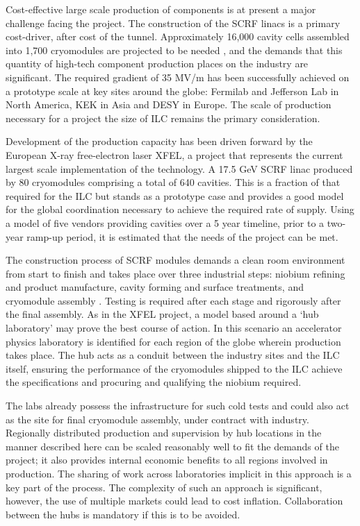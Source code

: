 Cost-effective large scale production of components is at present a major challenge facing the project. The construction of the SCRF linacs is a primary cost-driver, after cost of the tunnel. Approximately 16,000 cavity cells assembled into 1,700 cryomodules are projected to be needed \cite{ILC:PIPReport}, and the demands that this quantity of high-tech component production places on the industry are significant. The required gradient of 35 MV/m has been successfully achieved on a prototype scale at key sites around the globe: Fermilab and Jefferson Lab in North America, KEK in Asia and DESY in Europe. The scale of production necessary for a project the size of ILC remains the primary consideration.

Development of the production capacity has been driven forward by the European X-ray free-electron laser XFEL, a project that represents the current largest scale implementation of the technology. A 17.5 GeV SCRF linac produced by 80 cryomodules comprising a total of 640 cavities. This is a fraction of that required for the ILC but stands as a prototype case and provides a good model for the global coordination necessary to achieve the required rate of supply. Using a model of five vendors providing cavities over a 5 year timeline, prior to a two-year ramp-up period, it is estimated that the needs of the project can be met.

The construction process of SCRF modules demands a clean room environment from start to finish and takes place over three industrial steps: niobium refining and product manufacture, cavity forming and surface treatments, and cryomodule assembly \cite{IPAC:Industrialisation}. Testing is required after each stage and rigorously after the final assembly. As in the XFEL project, a model based around a `hub laboratory' may prove the best course of action. In this scenario an accelerator physics laboratory is identified for each region of the globe wherein production takes place. The hub acts as a conduit between the industry sites and the ILC itself, ensuring the performance of the cryomodules shipped to the ILC achieve the specifications and procuring and qualifying the niobium required. 

The labs already possess the infrastructure for such cold tests and could also act as the site for final cryomodule assembly, under contract with industry. Regionally distributed production and supervision by hub locations in the manner described here can be scaled reasonably well to fit the demands of the project; it also provides internal economic benefits to all regions involved in production. The sharing of work across laboratories implicit in this approach is a key part of the process. The complexity of such an approach is significant, however, the use of multiple markets could lead to cost inflation. Collaboration between the hubs is mandatory if this is to be avoided.

